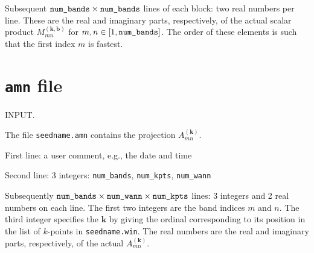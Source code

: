 Subsequent $\verb#num_bands#\times\verb#num_bands#$ lines of each
block: two real numbers per line. These are the real and imaginary
parts, respectively, of the actual scalar product
$M_{mn}^{(\mathbf{k,b})}$ for $m,n \in [1,\verb#num_bands#]$. The
order of these elements is such that the first index $m$ is fastest.


\section{{\tt amn} file}

INPUT.

The file \verb#seedname.amn# contains the projection
$A_{mn}^{(\mathbf{k})}$.

First line: a user comment, e.g., the date and time


Second line: 3 integers: \verb#num_bands#, \verb#num_kpts#, \verb#num_wann#

                                     
Subsequently
$\verb#num_bands#\times\verb#num_wann#\times\verb#num_kpts#$ 
lines: 3 integers and 2 real numbers on each line. The first 
two integers are the band indices $m$ and $n$. The third integer specifies
the $\mathbf{k}$ by giving the ordinal corresponding to its position
in the list of $k$-points in \verb#seedname.win#. The real numbers
are the real and imaginary parts, respectively, of the actual
$A_{mn}^{(\mathbf{k})}$.



